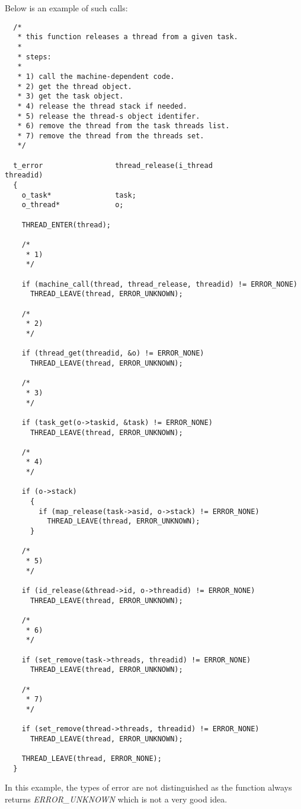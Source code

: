 Below is an example of such calls:

\begin{verbatim}
  /*
   * this function releases a thread from a given task.
   *
   * steps:
   *
   * 1) call the machine-dependent code.
   * 2) get the thread object.
   * 3) get the task object.
   * 4) release the thread stack if needed.
   * 5) release the thread-s object identifer.
   * 6) remove the thread from the task threads list.
   * 7) remove the thread from the threads set.
   */

  t_error                 thread_release(i_thread                 threadid)
  {
    o_task*               task;
    o_thread*             o;

    THREAD_ENTER(thread);

    /*
     * 1)
     */

    if (machine_call(thread, thread_release, threadid) != ERROR_NONE)
      THREAD_LEAVE(thread, ERROR_UNKNOWN);

    /*
     * 2)
     */

    if (thread_get(threadid, &o) != ERROR_NONE)
      THREAD_LEAVE(thread, ERROR_UNKNOWN);

    /*
     * 3)
     */

    if (task_get(o->taskid, &task) != ERROR_NONE)
      THREAD_LEAVE(thread, ERROR_UNKNOWN);

    /*
     * 4)
     */

    if (o->stack)
      {
        if (map_release(task->asid, o->stack) != ERROR_NONE)
          THREAD_LEAVE(thread, ERROR_UNKNOWN);
      }

    /*
     * 5)
     */

    if (id_release(&thread->id, o->threadid) != ERROR_NONE)
      THREAD_LEAVE(thread, ERROR_UNKNOWN);

    /*
     * 6)
     */

    if (set_remove(task->threads, threadid) != ERROR_NONE)
      THREAD_LEAVE(thread, ERROR_UNKNOWN);

    /*
     * 7)
     */

    if (set_remove(thread->threads, threadid) != ERROR_NONE)
      THREAD_LEAVE(thread, ERROR_UNKNOWN);

    THREAD_LEAVE(thread, ERROR_NONE);
  }
\end{verbatim}

In this example, the types of error are not distinguished as the function
always returns \textit{ERROR\_UNKNOWN} which is not a very good idea.
